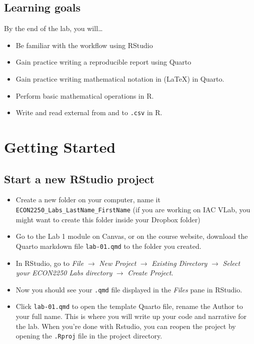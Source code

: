 \documentclass[
  letterpaper,
  DIV=11,
  numbers=noendperiod]{scrartcl}
\providecommand{\tightlist}{%
  \setlength{\itemsep}{0pt}\setlength{\parskip}{0pt}}\usepackage{longtable,booktabs,array}
\begin{document}
\subsection{Learning goals}\label{learning-goals}

By the end of the lab, you will\ldots{}

\begin{itemize}
\tightlist
\item
  Be familiar with the workflow using RStudio
\item
  Gain practice writing a reproducible report using Quarto
\item
  Gain practice writing mathematical notation in (LaTeX) in Quarto.
\item
  Perform basic mathematical operations in R.
\item
  Write and read external from and to \texttt{.csv} in R.
\end{itemize}

\section{Getting Started}\label{getting-started}

\subsection{Start a new RStudio
project}\label{start-a-new-rstudio-project}

\begin{itemize}
\tightlist
\item
  Create a new folder on your computer, name it
  \texttt{ECON2250\_Labs\_LastName\_FirstName} (if you are working on
  IAC VLab, you might want to create this folder inside your Dropbox
  folder)
\item
  Go to the Lab 1 module on Canvas, or on the course website, download
  the Quarto markdown file \texttt{lab-01.qmd} to the folder you
  created.
\item
  In RStudio, go to \emph{File} \(\rightarrow\) \emph{New Project}
  \(\rightarrow\) \emph{Existing Directory} \(\rightarrow\) \emph{Select
  your ECON2250 Labs directory} \(\rightarrow\) \emph{Create Project}.
\item
  Now you should see your \texttt{.qmd} file displayed in the
  \emph{Files} pane in RStudio.
\item
  Click \texttt{lab-01.qmd} to open the template Quarto file, rename the
  Author to your full name. This is where you will write up your code
  and narrative for the lab. When you're done with Rstudio, you can
  reopen the project by opening the \texttt{.Rproj} file in the project
  directory.
\end{itemize}
\end{document}
